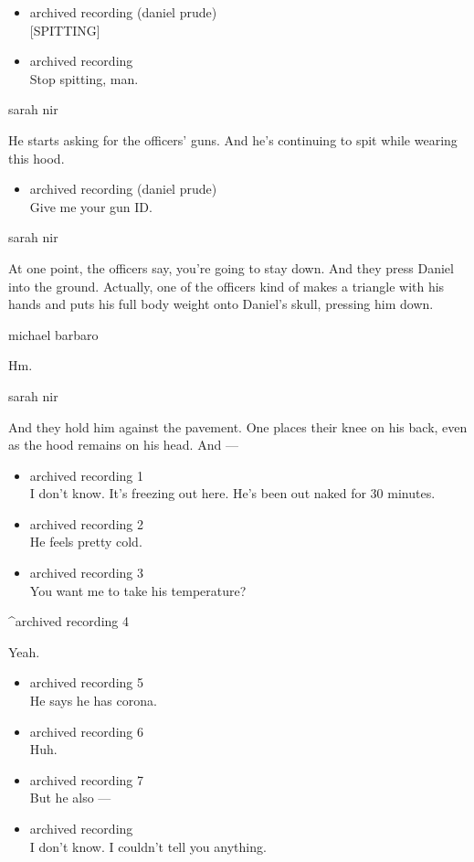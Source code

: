 \begin{itemize}
\item
  archived recording (daniel prude)\\
  {[}SPITTING{]}
\item
  archived recording\\
  Stop spitting, man.
\end{itemize}

sarah nir

He starts asking for the officers' guns. And he's continuing to spit
while wearing this hood.

\begin{itemize}
\tightlist
\item
  archived recording (daniel prude)\\
  Give me your gun ID.
\end{itemize}

sarah nir

At one point, the officers say, you're going to stay down. And they
press Daniel into the ground. Actually, one of the officers kind of
makes a triangle with his hands and puts his full body weight onto
Daniel's skull, pressing him down.

michael barbaro

Hm.

sarah nir

And they hold him against the pavement. One places their knee on his
back, even as the hood remains on his head. And ---

\begin{itemize}
\item
  archived recording 1\\
  I don't know. It's freezing out here. He's been out naked for 30
  minutes.
\item
  archived recording 2\\
  He feels pretty cold.
\item
  archived recording 3\\
  You want me to take his temperature?
\end{itemize}

\^{}archived recording 4

Yeah.

\begin{itemize}
\item
  archived recording 5\\
  He says he has corona.
\item
  archived recording 6\\
  Huh.
\item
  archived recording 7\\
  But he also ---
\item
  archived recording\\
  I don't know. I couldn't tell you anything.
\end{itemize}

